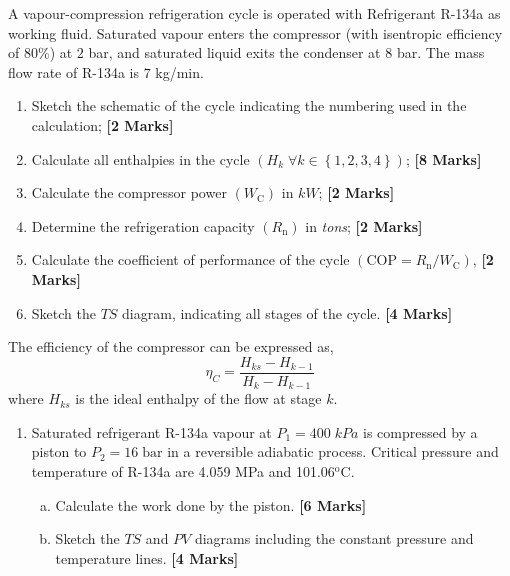 \documentclass[calculator,steamtables,refrigeranttables]{exam}
\newcommand{\frc}{\displaystyle\frac}
\begin{document}
\begin{question} A vapour-compression refrigeration cycle is operated with Refrigerant R-134a as working fluid. Saturated vapour enters the compressor (with isentropic efficiency of 80$\%$) at $2$ bar, and saturated liquid exits the condenser at $8$ bar. The mass flow rate of R-134a is $7$ kg/min.
\begin{enumerate}
\item Sketch the schematic of the cycle indicating the numbering used in the calculation; {\bf [2 Marks]}
\item Calculate all enthalpies in the cycle $\left(H_{k}\;\forall k\in\left\{1,2,3,4\right\}\right)$; {\bf [8 Marks]}
\item Calculate the compressor power $\left(W_{\text{C}}\right)$ in $kW$; {\bf [2 Marks]}
\item Determine the refrigeration capacity $\left(R_{\text{n}}\right)$ in {\it tons}; {\bf [2 Marks]}
\item Calculate the coefficient of performance of the cycle $\left(\text{COP}=R_{\text{n}}/W_{\text{C}}\right)$, {\bf [2 Marks]}
\item Sketch the $TS$ diagram, indicating all stages of the cycle. {\bf [4 Marks]}
\end{enumerate}

The efficiency of the compressor can be expressed as,
\begin{displaymath}
\eta_{C}=\frc{H_{ks}-H_{k-1}}{H_{k}-H_{k-1}} 
\end{displaymath}
where $H_{ks}$ is the ideal enthalpy of the flow at stage $k$.

\end{question}

\clearpage


\begin{question} 
\begin{enumerate}%
\item Saturated refrigerant R-134a vapour at $P_{1}=400\;kPa$ is compressed by a piston to $P_{2}=16\;\text{bar}$ in a reversible adiabatic process. Critical pressure and temperature of R-134a are 4.059 MPa and 101.06$^{\text{o}}$C.
\begin{enumerate}[(a)]
\item Calculate the work done by the piston. {\bf [6 Marks]}
\item Sketch the $TS$ and $PV$ diagrams including the constant pressure and temperature lines. {\bf [4 Marks]}
\end{enumerate}
\end{enumerate}


\end{question}



\vfill

\paperend
\end{document}
